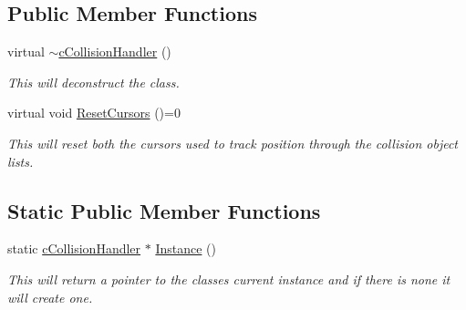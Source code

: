 \subsection*{Public Member Functions}
\begin{DoxyCompactItemize}
\item 
\hypertarget{classc_collision_handler_a5810098e3ca35eac5cb23936840787ef}{
virtual \hyperlink{classc_collision_handler_a5810098e3ca35eac5cb23936840787ef}{$\sim$cCollisionHandler} ()}
\label{classc_collision_handler_a5810098e3ca35eac5cb23936840787ef}

\begin{DoxyCompactList}\small\item\em This will deconstruct the class. \end{DoxyCompactList}\item 
\hypertarget{classc_collision_handler_a4fe00bffd2defe0a71a17c5fadd3b890}{
virtual void \hyperlink{classc_collision_handler_a4fe00bffd2defe0a71a17c5fadd3b890}{ResetCursors} ()=0}
\label{classc_collision_handler_a4fe00bffd2defe0a71a17c5fadd3b890}

\begin{DoxyCompactList}\small\item\em This will reset both the cursors used to track position through the collision object lists. \end{DoxyCompactList}\end{DoxyCompactItemize}
\subsection*{Static Public Member Functions}
\begin{DoxyCompactItemize}
\item 
\hypertarget{classc_collision_handler_a04d5c8d5b7ac854b4958dca195bf1c1b}{
static \hyperlink{classc_collision_handler}{cCollisionHandler} $\ast$ \hyperlink{classc_collision_handler_a04d5c8d5b7ac854b4958dca195bf1c1b}{Instance} ()}
\label{classc_collision_handler_a04d5c8d5b7ac854b4958dca195bf1c1b}

\begin{DoxyCompactList}\small\item\em This will return a pointer to the classes current instance and if there is none it will create one. \end{DoxyCompactList}\end{DoxyCompactItemize}
